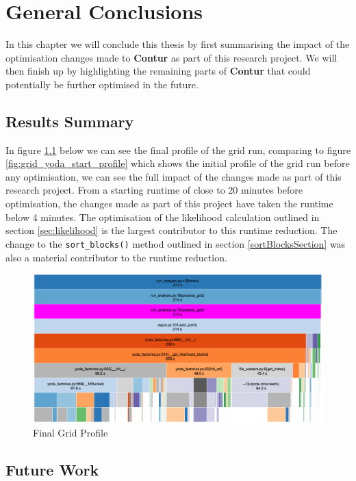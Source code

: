 \chapter{General Conclusions}
\label{chapterlabel6}
In this chapter we will conclude this thesis by first summarising the impact of the optimisation changes made to \textbf{Contur} as part of this research project. We will then finish up by highlighting the remaining parts of \textbf{Contur} that could potentially be further optimised in the future.

\section{Results Summary}

In figure \ref{fig:final_grid_profile} below we can see the final profile of the grid run, comparing to figure \ref{fig:grid_yoda_start_profile} which shows the initial profile of the grid run before any optimisation, we can see the full impact of the changes made as part of this research project. From a starting runtime of close to 20 minutes before optimisation, the changes made as part of this project have taken the runtime below 4 minutes. The optimisation of the likelihood calculation outlined in section \ref{sec:likelihood} is the largest contributor to this runtime reduction. The change to the \texttt{sort\_blocks()} method outlined in section \ref{sortBlocksSection} was also a material contributor to the runtime reduction.

\begin{figure}[H]
\centering
\includegraphics[scale=0.3]{plots/final_grid_profile.png}
\caption{Final Grid Profile}
\label{fig:final_grid_profile}
\end{figure}

\section{Future Work}

